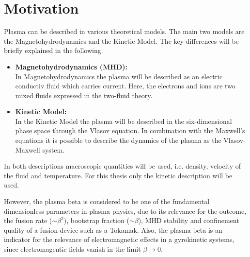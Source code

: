 
\NewPage
\chapter{Motivation}
\label{chap:motivation}

\thispagestyle{empty}
\newpage

Plasma can be described in various theoretical models. The main two models are the Magnetohydrodynamics and the Kinetic Model. The key differences will be briefly explained in the following.
\begin{itemize}
    \item \textbf{Magnetohydrodynamics (MHD):}\\
        In Magnetohydrodynamics the plasma will be described as an electric conductiv fluid which carries current. Here, the electrons and ions are two mixed fluids expressed in the two-fluid theory. 
    \item \textbf{Kinetic Model:}\\
        In the Kinetic Model the plasma will be described in the six-dimensional phase space through the Vlasov equation. In combination with the Maxwell's equations it is possible to describe the dynamics of the plasma as the Vlasov-Maxwell system. 
\end{itemize}
In both descriptions macroscopic quantities will be used, i.e. density, velocity of the fluid and temperature. For this thesis only the kinetic description will be used.

However, the plasma beta is considered to be one of the fundamental dimensionless parameters in plasma physics, due to its relevance for the outcome, the fusion rate ($\sim \beta^2$), bootstrap fraction ($\sim \beta$), MHD stability and confinement quality of a fusion device such as a Tokamak. Also, the plasma beta is an indicator for the relevance of electromagnetic effects in a gyrokinetic systems, since electromagentic fields vanish in the limit $\beta \rightarrow 0$. \bigskip

